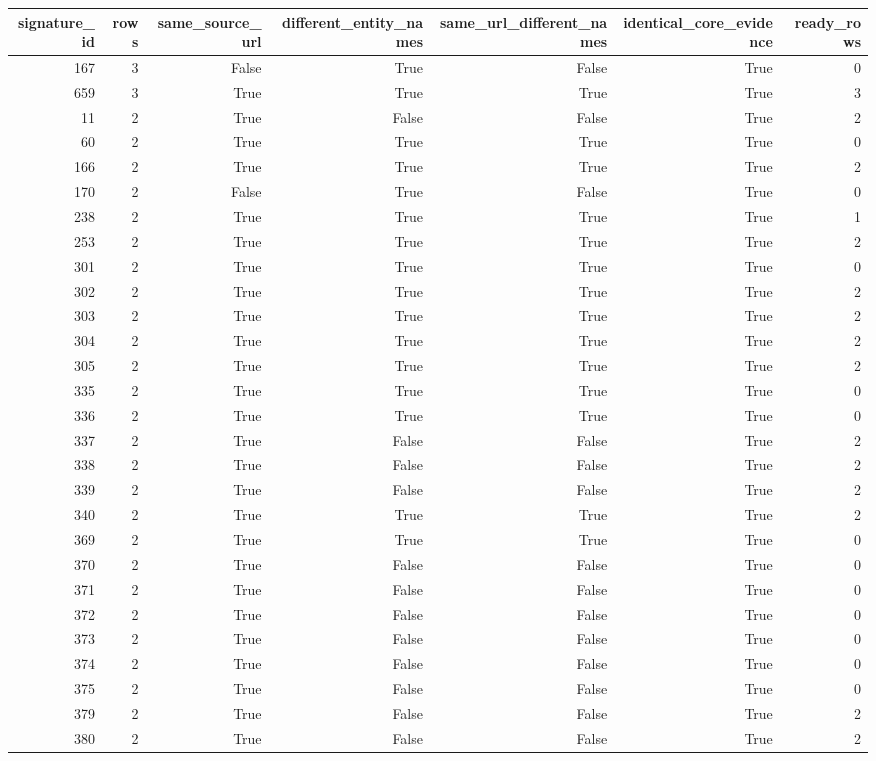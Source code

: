 \begin{tabular}{rrrrrrr}
\toprule
signature\_id & rows & same\_source\_url & different\_entity\_names & same\_url\_different\_names & identical\_core\_evidence & ready\_rows \\
\midrule
167 & 3 & False & True & False & True & 0 \\
659 & 3 & True & True & True & True & 3 \\
11 & 2 & True & False & False & True & 2 \\
60 & 2 & True & True & True & True & 0 \\
166 & 2 & True & True & True & True & 2 \\
170 & 2 & False & True & False & True & 0 \\
238 & 2 & True & True & True & True & 1 \\
253 & 2 & True & True & True & True & 2 \\
301 & 2 & True & True & True & True & 0 \\
302 & 2 & True & True & True & True & 2 \\
303 & 2 & True & True & True & True & 2 \\
304 & 2 & True & True & True & True & 2 \\
305 & 2 & True & True & True & True & 2 \\
335 & 2 & True & True & True & True & 0 \\
336 & 2 & True & True & True & True & 0 \\
337 & 2 & True & False & False & True & 2 \\
338 & 2 & True & False & False & True & 2 \\
339 & 2 & True & False & False & True & 2 \\
340 & 2 & True & True & True & True & 2 \\
369 & 2 & True & True & True & True & 0 \\
370 & 2 & True & False & False & True & 0 \\
371 & 2 & True & False & False & True & 0 \\
372 & 2 & True & False & False & True & 0 \\
373 & 2 & True & False & False & True & 0 \\
374 & 2 & True & False & False & True & 0 \\
375 & 2 & True & False & False & True & 0 \\
379 & 2 & True & False & False & True & 2 \\
380 & 2 & True & False & False & True & 2 \\

\end{tabular}
